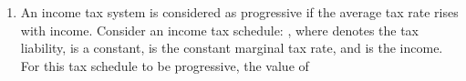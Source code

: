 \documentclass[12pt]{article}
\theoremstyle{remark}
\begin{document}
\begin{enumerate}
\hfill{}
\item  An income tax system is considered as progressive if the average tax rate rises with income. Consider an income tax schedule: 
, where  denotes the tax liability,  is a constant,  is the constant marginal tax rate, and  is the income. For this tax schedule to be progressive, the value of  \\
\begin{enumerate} 
\end{enumerate}
\end{enumerate}
\end{document}
